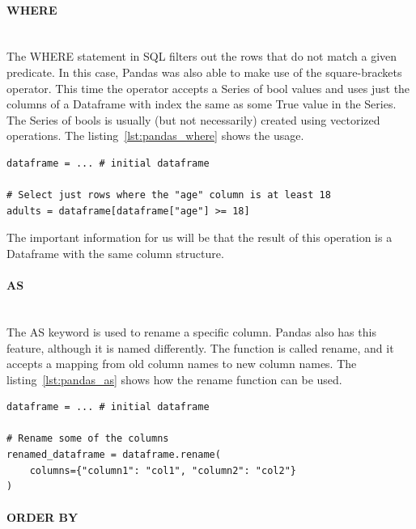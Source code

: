 \paragraph{WHERE} \leavevmode \\

The WHERE statement in SQL filters out the rows that do not match a given predicate.
In this case, Pandas was also able to make use of the square-brackets operator.
This time the operator accepts a Series of bool values and uses just the columns of a Dataframe with index the same as
some True value in the Series.
The Series of bools is usually (but not necessarily) created using vectorized operations.
The listing~\ref{lst:pandas_where} shows the usage.

\begin{lstlisting}[caption=Where in Pandas, label={lst:pandas_where}, captionpos=b]
dataframe = ... # initial dataframe

# Select just rows where the "age" column is at least 18
adults = dataframe[dataframe["age"] >= 18]
\end{lstlisting}

The important information for us will be that the result of this operation is a Dataframe with the same column structure.

\paragraph{AS} \leavevmode \\

The AS keyword is used to rename a specific column.
Pandas also has this feature, although it is named differently.
The function is called rename, and it accepts a mapping from old column names to new column names.
The listing~\ref{lst:pandas_as} shows how the rename function can be used.

\begin{lstlisting}[caption=As in Pandas, label={lst:pandas_as}, captionpos=b]
dataframe = ... # initial dataframe

# Rename some of the columns
renamed_dataframe = dataframe.rename(
    columns={"column1": "col1", "column2": "col2"}
)
\end{lstlisting}

\paragraph{ORDER BY} \leavevmode \\


